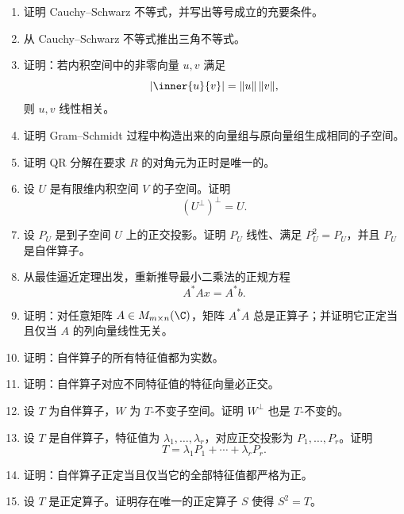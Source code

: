 \begin{enumerate}[label=\textbf{5.\arabic*.},start=26]
  \item \medium 证明 Cauchy--Schwarz 不等式，并写出等号成立的充要条件。

  \item \medium 从 Cauchy--Schwarz 不等式推出三角不等式。

  \item \medium 证明：若内积空间中的非零向量 $u,v$ 满足
  \[
  |\inner{u}{v}|=\|u\|\,\|v\|,
  \]
  则 $u,v$ 线性相关。

  \item \medium 证明 Gram--Schmidt 过程中构造出来的向量组与原向量组生成相同的子空间。

  \item \medium 证明 QR 分解在要求 $R$ 的对角元为正时是唯一的。

  \item \medium 设 $U$ 是有限维内积空间 $V$ 的子空间。证明
  \[
  (U^{\perp})^{\perp}=U.
  \]

  \item \medium 设 $P_U$ 是到子空间 $U$ 上的正交投影。证明 $P_U$ 线性、满足 $P_U^2=P_U$，并且 $P_U$ 是自伴算子。

  \item \medium 从最佳逼近定理出发，重新推导最小二乘法的正规方程
  \[
  A^*Ax=A^*b.
  \]

  \item \medium 证明：对任意矩阵 $A\in M_{m\times n}(\C)$，矩阵 $A^*A$ 总是正算子；并证明它正定当且仅当 $A$ 的列向量线性无关。

  \item \medium 证明：自伴算子的所有特征值都为实数。

  \item \medium 证明：自伴算子对应不同特征值的特征向量必正交。

  \item \medium 设 $T$ 为自伴算子，$W$ 为 $T$-不变子空间。证明 $W^{\perp}$ 也是 $T$-不变的。

  \item \medium 设 $T$ 是自伴算子，特征值为 $\lambda_1,\dots,\lambda_r$，对应正交投影为 $P_1,\dots,P_r$。证明
  \[
  T=\lambda_1P_1+\cdots+\lambda_rP_r.
  \]

  \item \medium 证明：自伴算子正定当且仅当它的全部特征值都严格为正。

  \item \medium 设 $T$ 是正定算子。证明存在唯一的正定算子 $S$ 使得 $S^2=T$。


\end{enumerate}

